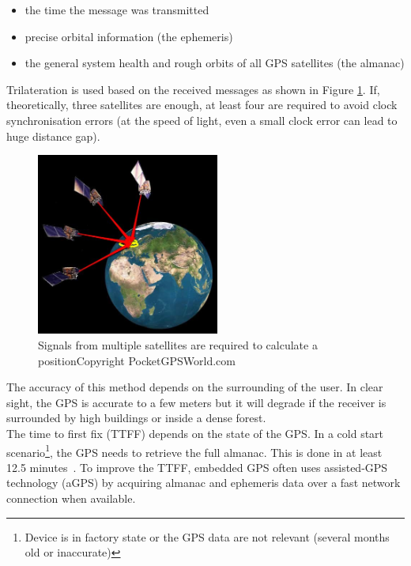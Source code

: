 \begin{itemize}
\item the time the message was transmitted
\item precise orbital information (the ephemeris)
\item the general system health and rough orbits of all GPS satellites (the almanac)
\end{itemize}

Trilateration is used based on the received messages as shown in Figure \ref{fig:gps-earth}.
If, theoretically, three satellites are enough, at least four are required to avoid clock synchronisation errors (at the speed of light, even a small clock error can lead to huge distance gap).\\

\begin{figure}[h]
  \centering
  \includegraphics[width=6cm]{images/gps.jpg}
  \caption{Signals from multiple satellites are required to calculate a position\newline Copyright PocketGPSWorld.com}
  \label{fig:gps-earth}
\end{figure}


The accuracy of this method depends on the surrounding of the user.
In clear sight, the GPS is accurate to a few meters but it will degrade if the receiver is surrounded by high buildings or inside a dense forest.\\

The time to first fix (TTFF) depends on the state of the GPS.
In a cold start scenario\footnote{Device is in factory state or the GPS data are not relevant (several months old or inaccurate)}, the GPS needs to retrieve the full almanac.
This is done in at least 12.5 minutes~\cite{gpsuser}.
To improve the TTFF, embedded GPS often uses assisted-GPS technology (aGPS) by acquiring almanac and ephemeris data over a fast network connection when available.

